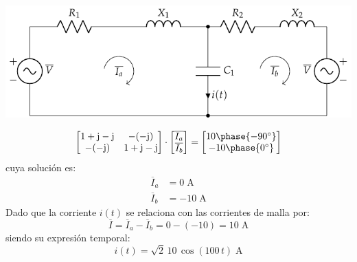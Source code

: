 \begin{center}
  \includegraphics{figuras/BT2_13_mod.pdf}
\end{center}

\begin{equation*}
  \begin{bmatrix}
    1+\mathrm{j}-\mathrm{j} & -(-\mathrm{j})\\
    -(-\mathrm{j}) & 1+\mathrm{j}-\mathrm{j}
  \end{bmatrix}
  \cdot
  \begin{bmatrix}
    \overline{I_a}\\
    \overline{I_b}
  \end{bmatrix}
  =
  \begin{bmatrix}
    10\phase{-90^\circ}\\
    -10\phase{0^\circ}
  \end{bmatrix}
\end{equation*}
cuya solución es:
\begin{align*}
  \overline{I}_a&=0\;\si{\ampere}\\
  \overline{I}_b&=-10\;\si{\ampere}
\end{align*}
Dado que la corriente $i(t)$ se relaciona con las corrientes de malla
por:
\begin{equation*}
  \overline{I}=\overline{I}_a-\overline{I}_b=0-(-10)=10\;\si{\ampere}
\end{equation*}
siendo su expresión temporal:
\begin{equation*}
  i(t)=\sqrt{2}\,10\,\cos(100\,t)\;\si{\ampere}
\end{equation*}




